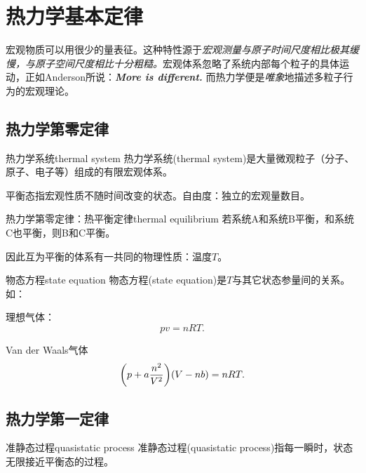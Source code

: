 \chapter{热力学基本定律}
宏观物质可以用很少的量表征。这种特性源于\textit{宏观测量与原子时间尺度相比极其缓慢，与原子空间尺度相比十分粗糙。}宏观体系忽略了系统内部每个粒子的具体运动，正如Anderson所说：\textbf{\textit{More is different.}}
而热力学便是\textit{唯象}地描述多粒子行为的宏观理论。
\section{热力学第零定律}
\begin{definition}{热力学系统}{thermal system}
	热力学系统(thermal system)是大量微观粒子（分子、原子、电子等）组成的有限宏观体系。
\end{definition}
平衡态指宏观性质不随时间改变的状态。自由度：独立的宏观量数目。
\begin{theorem}{热力学第零定律：热平衡定律}{thermal equilibrium}
	若系统A和系统B平衡，和系统C也平衡，则B和C平衡。
\end{theorem}
因此互为平衡的体系有一共同的物理性质：温度$T$。
\begin{definition}{物态方程}{state equation}
	物态方程(state equation)是$T$与其它状态参量间的关系。如：
	\begin{compactitem}
		\item 理想气体：
		\begin{equation}
			pv=nRT.
		\end{equation}
		\item Van der Waals气体
		\begin{equation}
			\biggl(p+a\frac{n^2}{V^2}\biggr)(V-nb)=nRT.
		\end{equation}
	\end{compactitem}
\end{definition}
\section{热力学第一定律}
\begin{definition}{准静态过程}{quasistatic process}
	准静态过程(quasistatic process)指每一瞬时，状态无限接近平衡态的过程。
\end{definition}


